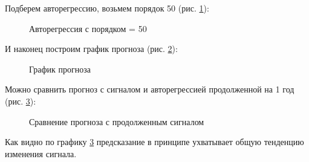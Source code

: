 \documentclass[a4paper,oneside,14pt]{extreport}
\begin{document}
Подберем авторегрессию, возьмем порядок 50 (рис. \ref{task3_predict_ar50}):
\begin{figure}[!h]
	\caption{Авторегрессия с порядком = 50}
	\label{task3_predict_ar50}
\end{figure}

\newpage
И наконец построим график прогноза (рис. \ref{task3_predict}):
\begin{figure}[!h]
	\caption{График прогноза}
	\label{task3_predict}
\end{figure}

Можно сравнить прогноз с сигналом и авторегрессией продолженной на 1 год (рис. \ref{task3_predict_compare}):
\begin{figure}[!h]
	\caption{Сравнение прогноза с продолженным сигналом}
	\label{task3_predict_compare}
\end{figure}

Как видно по графику \ref{task3_predict_compare} предсказание в принципе ухватывает общую тенденцию изменения сигнала.
\end{document}
